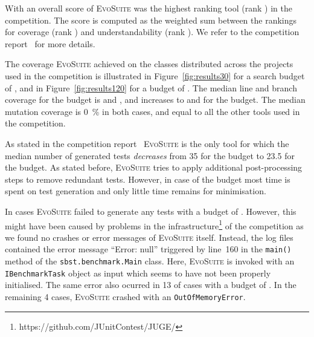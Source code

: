 \documentclass[10pt,conference]{IEEEtran}
\newcommand{\project}[1]{\textsc{#1}\xspace}
\newcommand{\Threeten}{\project{Threeten}}
\newcommand{\EVOSUITE}{\textsc{EvoSuite}\xspace}
\begin{document}
With an overall score of \score \EVOSUITE was the highest ranking tool
(rank \rank) in the competition. The score is computed as the weighted
sum between the rankings for coverage (rank \rankCoverage) and understandability
(rank \rankUnderstandability). We refer to the competition report~\cite{SBFT-toolcomp23}
for more details.

The coverage \EVOSUITE achieved on the \cuts classes distributed across the \projects
projects used in the competition is illustrated in Figure~\ref{fig:results30} for a search
budget of \budgetShort, and in Figure~\ref{fig:results120} for a budget of \budgetLong.
The median line and branch coverage for the \budgetShort budget is
\medLinesCoverageRatioShort and \medConditionsCoverageRatioShort, and
increases to \medLinesCoverageRatioLong and \medConditionsCoverageRatioLong
for the \budgetLong budget. The median mutation coverage is \SI{0}{\percent} in
both cases, and equal to all the other tools used in the competition.

As stated in the competition report~\cite{SBFT-toolcomp23} \EVOSUITE is the
only tool for which the median number of generated tests \emph{decreases}
from \num{35} for the \budgetShort budget to \num{23.5} for the \budgetLong budget.
As stated before, \EVOSUITE tries to apply additional post-processing steps to remove
redundant tests. However, in case of the \budgetShort budget most time is spent on test
generation and only little time remains for minimisation.


In \numTestGenFailedShort cases \EVOSUITE failed to generate any tests with a
budget of \budgetShort. However, this might have been caused by problems in the
infrastructure\footnote{https://github.com/JUnitContest/JUGE/}
of the competition as we found no crashes or error messages
of \EVOSUITE itself. Instead, the log files contained the error message
``Error: null'' triggered by line~160 in the \texttt{main()} method of
the \texttt{sbst.benchmark.Main} class. Here, \EVOSUITE is invoked with an
\texttt{IBenchmarkTask} object as input which seems to have not been properly
initialised.
%
The same error also ocurred in 13 of \numTestGenFailedLong
cases with a budget of \budgetLong. In the remaining 4 cases, \EVOSUITE crashed
with an \texttt{OutOfMemoryError}. %
\end{document}
